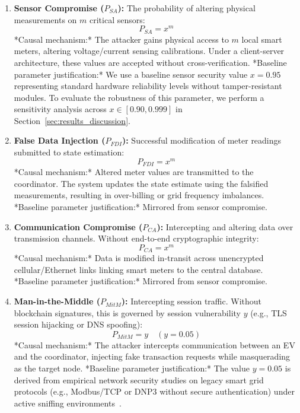 \documentclass[10pt,twocolumn,journal]{IEEEtran}
\begin{document}
\begin{enumerate}[leftmargin=*]
    \item \textbf{Sensor Compromise ($P_{SA}$):} The probability of altering physical measurements on $m$ critical sensors:
    \begin{equation}
    P_{SA} = x^m
    \end{equation}
    *Causal mechanism:* The attacker gains physical access to $m$ local smart meters, altering voltage/current sensing calibrations. Under a client-server architecture, these values are accepted without cross-verification.
    *Baseline parameter justification:* We use a baseline sensor security value $x = 0.95$ representing standard hardware reliability levels without tamper-resistant modules. To evaluate the robustness of this parameter, we perform a sensitivity analysis across $x \in [0.90, 0.999]$ in Section~\ref{sec:results_discussion}.

    \item \textbf{False Data Injection ($P_{FDI}$):} Successful modification of meter readings submitted to state estimation:
    \begin{equation}
    P_{FDI} = x^m
    \end{equation}
    *Causal mechanism:* Altered meter values are transmitted to the coordinator. The system updates the state estimate using the falsified measurements, resulting in over-billing or grid frequency imbalances.
    *Baseline parameter justification:* Mirrored from sensor compromise.

    \item \textbf{Communication Compromise ($P_{CA}$):} Intercepting and altering data over transmission channels. Without end-to-end cryptographic integrity:
    \begin{equation}
    P_{CA} = x^m
    \end{equation}
    *Causal mechanism:* Data is modified in-transit across unencrypted cellular/Ethernet links linking smart meters to the central database.
    *Baseline parameter justification:* Mirrored from sensor compromise.

    \item \textbf{Man-in-the-Middle ($P_{MitM}$):} Intercepting session traffic. Without blockchain signatures, this is governed by session vulnerability $y$ (e.g., TLS session hijacking or DNS spoofing):
    \begin{equation}
    P_{MitM} = y \quad (y = 0.05)
    \end{equation}
    *Causal mechanism:* The attacker intercepts communication between an EV and the coordinator, injecting fake transaction requests while masquerading as the target node.
    *Baseline parameter justification:* The value $y = 0.05$ is derived from empirical network security studies on legacy smart grid protocols (e.g., Modbus/TCP or DNP3 without secure authentication) under active sniffing environments~\cite{baumeister2010}.


\end{enumerate}
\end{document}
